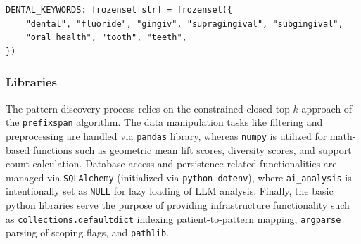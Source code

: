 \begin{lstlisting}[style=pythonstyle]
DENTAL_KEYWORDS: frozenset[str] = frozenset({
    "dental", "fluoride", "gingiv", "supragingival", "subgingival",
    "oral health", "tooth", "teeth",
})

\end{lstlisting}

\subsubsection*{Libraries}

The pattern discovery process relies on the constrained closed top-\(k\) approach of the \texttt{prefixspan} algorithm. The data manipulation tasks like filtering and preprocessing are handled via \texttt{pandas} library, whereas \texttt{numpy} is utilized for math-based functions such as geometric mean lift scores, diversity scores, and support count calculation. Database access and persistence-related functionalities are managed via \texttt{SQLAlchemy} (initialized via \texttt{python-dotenv}), where \texttt{ai\_analysis} is intentionally set as \texttt{NULL} for lazy loading of LLM analysis. Finally, the basic python libraries serve the purpose of providing infrastructure functionality such as \texttt{collections.defaultdict} indexing patient-to-pattern mapping, \texttt{argparse} parsing of scoping flags, and \texttt{pathlib}.

